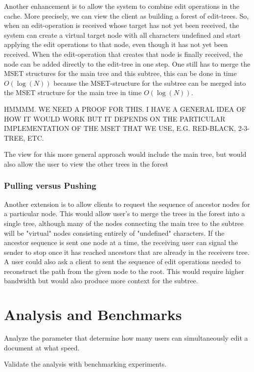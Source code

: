 \documentclass{amsart}
\begin{document}
Another enhancement is to allow the system to combine edit operations
in the cache. More precisely, we can view the client as building a forest
of edit-trees. So, when an edit-operation is received whose target has
not yet been received, the system can create a virtual target node
with all characters undefined and start applying the edit operations to
that node, even though it has not yet been received. When the edit-operation
that creates that node is finally received, the node can be added directly
to the edit-tree in one step.  One still has to merge the MSET structures
for the main tree and this subtree, this can be done in time $O(\log(N))$
because the MSET-structure for the subtree can be merged into the MSET
structure for the main tree in time $O(\log(N))$.

HMMMM.  WE NEED A PROOF FOR THIS. I HAVE A GENERAL IDEA OF HOW IT WOULD WORK
BUT IT DEPENDS ON THE PARTICULAR IMPLEMENTATION OF THE MSET THAT WE USE, E.G. 
RED-BLACK, 2-3-TREE, ETC.

The view for this more general approach would include the main tree, but would also
allow the user to view the other trees in the forest

\subsubsection{Pulling versus Pushing}
Another extension is to allow clients to request the sequence of ancestor nodes
for a particular node. This would allow user's to merge the trees in the forest
into a single tree, although many of the nodes connecting the main tree to the
subtree will be "virtual" nodes consisting entirely of "undefined" characters.
If the ancestor sequence is sent one node at a time, the receiving user can
signal the sender to stop once it has reached ancestors that are already in the
receivers tree. A user could also ask a client to sent the sequence of edit
operations needed to reconstruct the path from the given node to the root.
This would require higher bandwidth but would also produce more context for the
subtree.


\newpage
\section{Analysis and Benchmarks}

Analyze the parameter that determine how many users can 
simultaneously edit a document at what speed.

Validate the analysis with benchmarking experiments.
\end{document}
